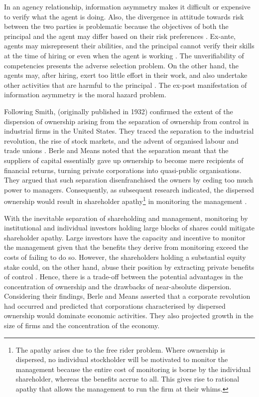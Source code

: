 \documentclass[a4paper, nobind]{templates/ociamthesis}
\begin{document}
In an agency relationship, information asymmetry makes it difficult or expensive to verify what the agent is doing. Also, the divergence in attitude towards risk between the two parties is problematic because the objectives of both the principal and the agent may differ based on their risk preferences \autocite{sun2016ownership}. Ex-ante, agents may misrepresent their abilities, and the principal cannot verify their skills at the time of hiring or even when the agent is working \autocite{eisenhardt1989agency}. The unverifiability of competencies presents the adverse selection problem. On the other hand, the agents may, after hiring, exert too little effort in their work, and also undertake other activities that are harmful to the principal \autocite{tirole2010theory}. The ex-post manifestation of information asymmetry is the moral hazard problem.

Following Smith, \textcite{berle1991modern} (originally published in 1932) confirmed the extent of the dispersion of ownership arising from the separation of ownership from control in industrial firms in the United States. They traced the separation to the industrial revolution, the rise of stock markets, and the advent of organised labour and trade unions \autocite{bendickson2016agency}. Berle and Means noted that the separation meant that the suppliers of capital essentially gave up ownership to become mere recipients of financial returns, turning private corporations into quasi-public organisations. They argued that such separation disenfranchised the owners by ceding too much power to managers. Consequently, as subsequent research indicated, the dispersed ownership would result in shareholder apathy\footnote{The apathy arises due to the free rider problem. Where ownership is dispersed, no individual stockholder will be motivated to monitor the management because the entire cost of monitoring is borne by the individual shareholder, whereas the benefits accrue to all. This gives rise to rational apathy that allows the management to run the firm at their whims.} in monitoring the management \autocite{battaglini2016dynamic}.

With the inevitable separation of shareholding and management, monitoring by institutional and individual investors holding large blocks of shares could mitigate shareholder apathy. Large investors have the capacity and incentive to monitor the management given that the benefits they derive from monitoring exceed the costs of failing to do so. However, the shareholders holding a substantial equity stake could, on the other hand, abuse their position by extracting private benefits of control \autocite{dyck2004private,doidge2004us}. Hence, there is a trade-off between the potential advantages in the concentration of ownership and the drawbacks of near-absolute dispersion. Considering their findings, Berle and Means asserted that a corporate revolution had occurred and predicted that corporations characterised by dispersed ownership would dominate economic activities. They also projected growth in the size of firms and the concentration of the economy.
\end{document}
